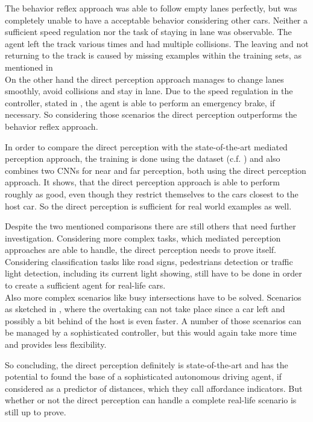 The behavior reflex approach was able to follow empty lanes perfectly, but was completely unable to have a acceptable behavior considering other cars. Neither a sufficient speed regulation nor the task of staying in lane was observable. The agent left the track various times and had multiple collisions. The leaving and not returning to the track is caused by missing examples within the training sets, as mentioned in \\
On the other hand the direct perception approach manages to change lanes smoothly, avoid collisions and stay in lane. Due to the speed regulation in the controller, stated in , the agent is able to perform an emergency brake, if necessary. So considering those scenarios the direct perception outperforms the behavior reflex approach.

In order to compare the direct perception with the state-of-the-art mediated perception approach, the training is done using the \kitti dataset (c.f. ) and also combines two CNNs for near and far perception, both using the direct perception approach. It shows, that the direct perception approach is able to perform roughly as good, even though they restrict themselves to the cars closest to the host car. So the direct perception is sufficient for real world examples as well. \cite{DeepDriving} \cite{chen2015deepdriving}

Despite the two mentioned comparisons there are still others that need further investigation. Considering more complex tasks, which mediated perception approaches are able to handle, the direct perception needs to prove itself.
Considering classification tasks like road signs, pedestrians detection or traffic light detection, including its current light showing, still have to be done in order to create a sufficient agent for real-life cars. \\
Also more complex scenarios like busy intersections have to be solved. Scenarios as sketched in , where the overtaking can not take place since a car left and possibly a bit behind of the host is even faster.
A number of those scenarios can be managed by a sophisticated controller, but this would again take more time and provides less flexibility.

So concluding, the direct perception definitely is state-of-the-art and has the potential to found the base of a sophisticated autonomous driving agent, if considered as a predictor of distances, which they call affordance indicators. But whether or not the direct perception can handle a complete real-life scenario is still up to prove.